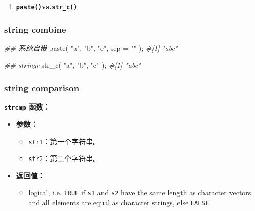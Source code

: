 \documentclass[
]{article}
\newenvironment{Shaded}{}{}
\newcommand{\AttributeTok}[1]{\textcolor[rgb]{0.49,0.56,0.16}{#1}}
\newcommand{\CommentTok}[1]{\textcolor[rgb]{0.38,0.63,0.69}{\textit{#1}}}
\newcommand{\DocumentationTok}[1]{\textcolor[rgb]{0.73,0.13,0.13}{\textit{#1}}}
\newcommand{\FunctionTok}[1]{\textcolor[rgb]{0.02,0.16,0.49}{#1}}
\newcommand{\NormalTok}[1]{#1}
\newcommand{\StringTok}[1]{\textcolor[rgb]{0.25,0.44,0.63}{#1}}
\begin{document}
\begin{enumerate}
\def\labelenumi{\arabic{enumi}.}
\item
  \textbf{\texttt{paste()}vs.\texttt{str\_c()}}
\end{enumerate}

\hypertarget{string-combine}{%
\subsubsection{\texorpdfstring{string combine
}{string combine }}\label{string-combine}}

\begin{Shaded}
\begin{Highlighting}[]
\DocumentationTok{\#\# 系统自带}
\FunctionTok{paste}\NormalTok{( }\StringTok{"a"}\NormalTok{, }\StringTok{"b"}\NormalTok{, }\StringTok{"c"}\NormalTok{, }\AttributeTok{sep =} \StringTok{""}\NormalTok{ );}
\CommentTok{\#[1] "abc"}

\DocumentationTok{\#\# stringr }
\FunctionTok{str\_c}\NormalTok{( }\StringTok{"a"}\NormalTok{, }\StringTok{"b"}\NormalTok{, }\StringTok{"c"}\NormalTok{ );}
\CommentTok{\#[1] "abc"}
\end{Highlighting}
\end{Shaded}

\hypertarget{string-comparison}{%
\subsubsection{string comparison}\label{string-comparison}}

\textbf{\texttt{strcmp} 函数：}

\begin{itemize}
\item
  \textbf{参数：}

  \begin{itemize}
  \item
    \texttt{str1}：第一个字符串。
  \item
    \texttt{str2}：第二个字符串。
  \end{itemize}
\item
  \textbf{返回值：}

  \begin{itemize}
  \item
    logical, i.e. \texttt{TRUE} if \texttt{s1} and \texttt{s2} have the
    same length as character vectors and all elements are equal as
    character strings, else \texttt{FALSE}.
  \end{itemize}
\end{itemize}
\end{document}
